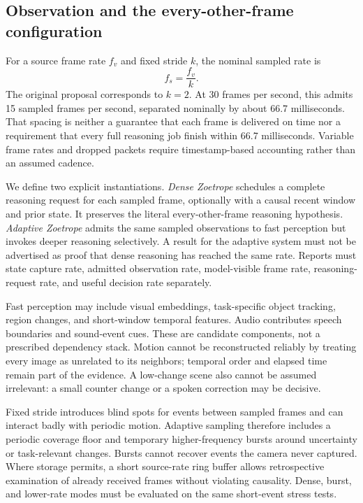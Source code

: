 \documentclass[11pt,letterpaper]{article}
\begin{document}
\subsection{Observation and the every-other-frame configuration}
For a source frame rate $f_v$ and fixed stride $k$, the nominal sampled rate is
\begin{equation}
 f_s=\frac{f_v}{k}.
 \label{eq:sampling}
\end{equation}
The original proposal corresponds to $k=2$. At 30 frames per second, this admits 15 sampled frames per second, separated nominally by about 66.7 milliseconds. That spacing is neither a guarantee that each frame is delivered on time nor a requirement that every full reasoning job finish within 66.7 milliseconds. Variable frame rates and dropped packets require timestamp-based accounting rather than an assumed cadence.

We define two explicit instantiations. \emph{Dense Zoetrope} schedules a complete reasoning request for each sampled frame, optionally with a causal recent window and prior state. It preserves the literal every-other-frame reasoning hypothesis. \emph{Adaptive Zoetrope} admits the same sampled observations to fast perception but invokes deeper reasoning selectively. A result for the adaptive system must not be advertised as proof that dense reasoning has reached the same rate. Reports must state capture rate, admitted observation rate, model-visible frame rate, reasoning-request rate, and useful decision rate separately.

Fast perception may include visual embeddings, task-specific object tracking, region changes, and short-window temporal features. Audio contributes speech boundaries and sound-event cues. These are candidate components, not a prescribed dependency stack. Motion cannot be reconstructed reliably by treating every image as unrelated to its neighbors; temporal order and elapsed time remain part of the evidence. A low-change scene also cannot be assumed irrelevant: a small counter change or a spoken correction may be decisive.

Fixed stride introduces blind spots for events between sampled frames and can interact badly with periodic motion. Adaptive sampling therefore includes a periodic coverage floor and temporary higher-frequency bursts around uncertainty or task-relevant changes. Bursts cannot recover events the camera never captured. Where storage permits, a short source-rate ring buffer allows retrospective examination of already received frames without violating causality. Dense, burst, and lower-rate modes must be evaluated on the same short-event stress tests.
\end{document}
